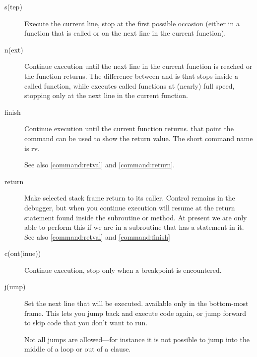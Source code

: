 \begin{description}

\item[s(tep) ]\label{command:step}

Execute the current line, stop at the first possible occasion
(either in a function that is called or on the next line in the
current function).

\item[n(ext) ]\label{command:next}

Continue execution until the next line in the current function
is reached or the function returns.  The difference between  and
 is that  stops inside a called function, while
 executes called functions at (nearly) full speed, 
stopping only at the next line in the current function.

\item[finish]\label{command:finish}

Continue execution until the current function returns.
that point the  command can be used to show the
return value. The short command name is rv.

See also \ref{command:retval} and \ref{command:return}.

\item[return]\label{command:return}

Make selected stack frame return to its caller. Control remains in the
debugger, but when you continue execution will resume at the return
statement found inside the subroutine or method.  At present we are
only able to perform this if we are in a subroutine that has a
 statement in it.  See also \ref{command:retval} and
\ref{command:finish}

\item[c(ont(inue))]

Continue execution, stop only when a breakpoint is encountered.

\item[j(ump) ]

Set the next line that will be executed. available only in the
bottom-most frame.  This lets you jump back and execute code
again, or jump forward to skip code that you don't want to run.

Not all jumps are allowed---for instance it
is not possible to jump into the middle of a  loop or out
of a  clause.

\end{description}

